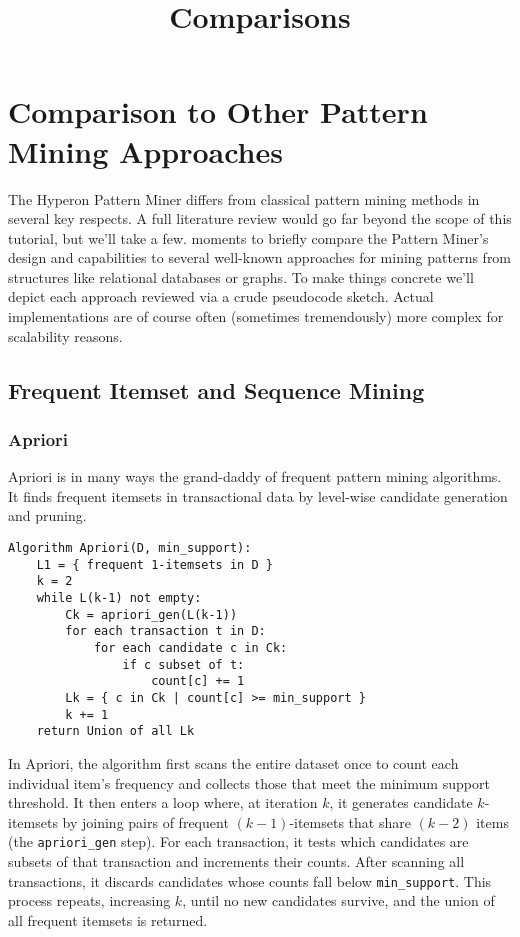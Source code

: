 \documentclass{article}
\title{Comparisons}
\begin{document}
\section{Comparison to Other Pattern Mining Approaches}

The Hyperon Pattern Miner differs from classical pattern mining methods in several key respects.   A full literature review would go far beyond the scope of this tutorial, but we'll take a few. moments to briefly compare the Pattern Miner's design and capabilities to several well-known approaches for mining patterns from structures like relational databases or graphs.   To make things concrete we'll depict each approach reviewed via a crude pseudocode sketch.  Actual implementations are of course often (sometimes tremendously) more complex for scalability reasons.


\subsection{Frequent Itemset and Sequence Mining}
\subsubsection{Apriori}

Apriori \cite{agrawal1994fast} is in many ways the grand-daddy of frequent pattern mining algorithms.  It finds frequent itemsets in transactional data by level-wise candidate generation and pruning.

\begin{verbatim}
Algorithm Apriori(D, min_support):
    L1 = { frequent 1-itemsets in D }
    k = 2
    while L(k-1) not empty:
        Ck = apriori_gen(L(k-1))
        for each transaction t in D:
            for each candidate c in Ck:
                if c subset of t:
                    count[c] += 1
        Lk = { c in Ck | count[c] >= min_support }
        k += 1
    return Union of all Lk
\end{verbatim}

In Apriori, the algorithm first scans the entire dataset once to count each individual item's frequency and collects those that meet the minimum support threshold.  It then enters a loop where, at iteration $k$, it generates candidate $k$-itemsets by joining pairs of frequent $(k-1)$-itemsets that share $(k-2)$ items (the \texttt{apriori\_gen} step).  For each transaction, it tests which candidates are subsets of that transaction and increments their counts.  After scanning all transactions, it discards candidates whose counts fall below \texttt{min\_support}.  This process repeats, increasing $k$, until no new candidates survive, and the union of all frequent itemsets is returned.
\end{document}
